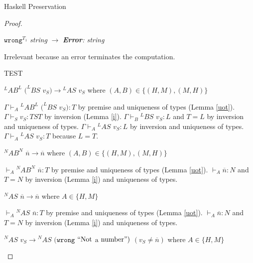 \begin{theorem}{Haskell Preservation}
\begin{proof}

\begin{case}{\oswrong}

$\mathtt{wrong}^{T_{1}}$ \emph{string} $\rightarrow$ \emph{\textbf{Error}: string}

Irrelevant because an error terminates the computation.
\end{case}


\begin{case}{\oshmmhneqa \oshmmhneqb}

TEST

\end{case}


\begin{case}
$^{L}AB^{L}$ $(^{L}BS$ $v_{S})\rightarrow{^{L}A}S$ $v_{S}$ where $(A,B)\in\lbrace(H,M),(M,H)\rbrace$

$\Gamma\vdash_{A}{^{L}A}B^{L}$ $(^{L}BS$ $v_{S}):T$ by premise and uniqueness of types (Lemma \ref{uot}).  $\Gamma\vdash_{S}v_{S}:TST$ by inversion (Lemma \ref{i}).  $\Gamma\vdash_{B}{^{L}B}S$ $v_{S}:L$ and $T=L$ by inversion and uniqueness of types.  $\Gamma\vdash_{A}{^{L}A}S$ $v_{S}:L$ by inversion and uniqueness of types.  $\Gamma\vdash_{A}{^{L}A}S$ $v_{S}:T$ because $L=T$.
\end{case}


\begin{case}
$^{N}AB^{N}$ $\overline{n}\rightarrow\overline{n}$ where $(A,B)\in\lbrace(H,M),(M,H)\rbrace$

$\vdash_{A}{^{N}A}B^{N}$ $\overline{n}:T$ by premise and uniqueness of types (Lemma \ref{uot}).  $\vdash_{A}\overline{n}:N$ and $T=N$ by inversion (Lemma \ref{i}) and uniqueness of types.
\end{case}


\begin{case}
$^{N}AS$ $\overline{n}\rightarrow\overline{n}$ where $A\in\lbrace H,M\rbrace$

$\vdash_{A}{^{N}A}S$ $\overline{n}:T$ by premise and uniqueness of types (Lemma \ref{uot}).  $\vdash_{A}\overline{n}:N$ and $T=N$ by inversion (Lemma \ref{i}) and uniqueness of types.
\end{case}


\begin{case}
$^{N}AS$ $v_{S}\rightarrow{^{N}A}S$ $(\mathtt{wrong}$ $\mathrm{``Not}$ $\mathrm{a}$ $\mathrm{number"})$ $(v_{S}\neq\overline{n})$ where $A\in\lbrace H,M\rbrace$


\end{case}
\end{proof}
\end{theorem}

